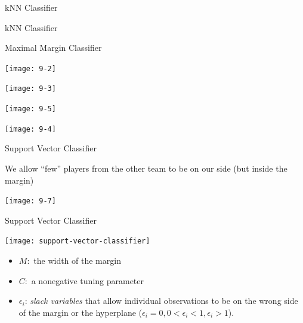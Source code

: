 \documentclass[14pt]{beamer}
\begin{document}
\begin{frame}{kNN Classifier}
\end{frame}


\begin{frame}{kNN Classifier}
\end{frame}



\begin{frame}{Maximal Margin Classifier}

   \begin{minipage}[c]{.65\linewidth}
      \texttt{[image: 9-2]}
   \end{minipage} \hfill
   \begin{minipage}[c]{.32\linewidth}
      \texttt{[image: 9-3]}
   \end{minipage}
   
   \begin{minipage}[c]{.68\linewidth}
      \texttt{[image: 9-5]}
   \end{minipage} \hfill
   \begin{minipage}[c]{.28\linewidth}
      \texttt{[image: 9-4]}
   \end{minipage} 
   


\end{frame}

\begin{frame}{Support Vector Classifier}

{\small We allow ``few'' players from the other team to be on our side (but inside the margin)}

\centerline{\texttt{[image: 9-7]}}

\end{frame}

\begin{frame}{Support Vector Classifier}

\centerline{\texttt{[image: support-vector-classifier]}}

\begin{itemize}\small
	\item $M:$ the width of the margin
	\item $C:$ a nonegative tuning parameter
	\item $\epsilon_i$: \emph{slack variables} that allow individual observations to be on the wrong side of the margin or the hyperplane ($\epsilon_i = 0, 0 <\epsilon_i < 1, \epsilon_i > 1$).
\end{itemize}


\end{frame}
\end{document}
